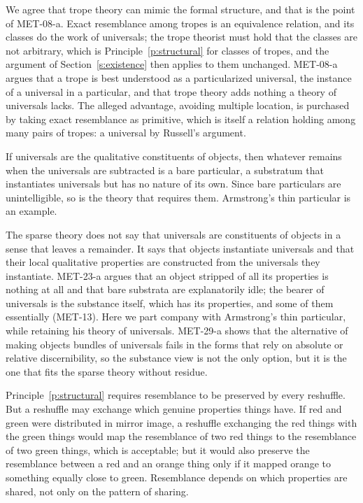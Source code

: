 \documentclass{situationist-preprint}
\begin{document}
\begin{reply}
We agree that trope theory can mimic the formal structure, and that is the point of MET-08-a. Exact resemblance among tropes is an equivalence relation, and its classes do the work of universals; the trope theorist must hold that the classes are not arbitrary, which is Principle~\ref{p:structural} for classes of tropes, and the argument of Section~\ref{s:existence} then applies to them unchanged. MET-08-a argues that a trope is best understood as a particularized universal, the instance of a universal in a particular, and that trope theory adds nothing a theory of universals lacks. The alleged advantage, avoiding multiple location, is purchased by taking exact resemblance as primitive, which is itself a relation holding among many pairs of tropes: a universal by Russell's argument.
\end{reply}

\begin{objection}\label{o:bare}
If universals are the qualitative constituents of objects, then whatever remains when the universals are subtracted is a bare particular, a substratum that instantiates universals but has no nature of its own. Since bare particulars are unintelligible, so is the theory that requires them. Armstrong's thin particular is an example.
\end{objection}

\begin{reply}
The sparse theory does not say that universals are constituents of objects in a sense that leaves a remainder. It says that objects instantiate universals and that their local qualitative properties are constructed from the universals they instantiate. MET-23-a argues that an object stripped of all its properties is nothing at all and that bare substrata are explanatorily idle; the bearer of universals is the substance itself, which has its properties, and some of them essentially (MET-13). Here we part company with Armstrong's thin particular, while retaining his theory of universals. MET-29-a shows that the alternative of making objects bundles of universals fails in the forms that rely on absolute or relative discernibility, so the substance view is not the only option, but it is the one that fits the sparse theory without residue.
\end{reply}

\begin{objection}\label{o:structural}
Principle~\ref{p:structural} requires resemblance to be preserved by every reshuffle. But a reshuffle may exchange which genuine properties things have. If red and green were distributed in mirror image, a reshuffle exchanging the red things with the green things would map the resemblance of two red things to the resemblance of two green things, which is acceptable; but it would also preserve the resemblance between a red and an orange thing only if it mapped orange to something equally close to green. Resemblance depends on which properties are shared, not only on the pattern of sharing.
\end{objection}
\end{document}
